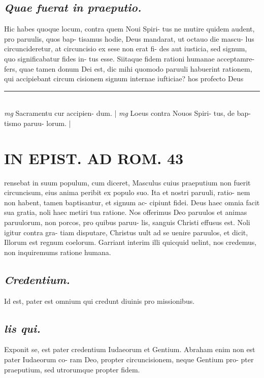 \documentclass{article}
\begin{document}
\begin{pages}
\subsection*{\textit{Quae fuerat in praeputio. }}\pstart Hic habes quoque locum, contra quem Noui Spiri- tus ne mutire quidem audent, pro paruulis, quos bap- tisamus hodie, Deus mandarat, ut octauo die mascu- lus circuncideretur, at circuncisio ex sese non erat fi- des aut iusticia, sed signum, quo significabatur fides in- tus esse. Siitaque fidem rationi humanae acceptamre- fers, quae tamen donum Dei est, dic mihi quomodo paruuli habuerint rationem, qui accipiebant circum cisionem signum internae iufticiae? hos profecto Deus  \pend
\vspace{0.5cm}\noindent
\vspace{0.2cm}\rule{1cm}{0.2pt}\\ 
\hspace{0.2cm}\textit{mg}
\footnotesize Sacramentu cur accipien- dum.  
\normalsize| 
\hspace{0.2cm}\textit{mg}
\footnotesize Loeus contra Nouos Spiri- tus, de bap- tismo paruu- lorum. 
\normalsize| 
\section*{IN EPIST. AD ROM.  43 }
\marginpar{[ p.]}\pstart rensebat in suum populum, cum diceret, Masculus cuius praeputium non fuerit circuncisum, eius anima peribit ex populo suo. Ita et nostri paruuli, ratio- nem non habent, tamen baptisantur, et signum ac- cipiunt fidei. Deus haec omnia facit sua gratia, noli haec metiri tua ratione. Nos offerimus Deo paruulos et animas paruulorum, non porcos, pro quibus paruu- lis, sanguis Christi effusus est. Noli igitur contra gra- tiam disputare, Christus uult ad se uenire paruulos, et dicit, Illorum est regnum coelorum. Garriant interim illi quicquid uelint, nos credemus, non inquiremums ratione humana.   \pend
{}
{}
\subsection*{\textit{Credentium. }}\pstart Id est, pater est omnium qui credunt diuinis pro missionibus.   \pend
{}
{}
\subsection*{\textit{lis qui. }}\pstart Exponit se, est pater credentium Iudaeorum et Gentium. Abraham enim non est pater Iudaeorum co- ram Deo, propter circuncisionem, neque Gentium pro- pter praeputium, sed utrorumque propter fidem.   \pend
{}
{}

\end{pages}
\end{document}
